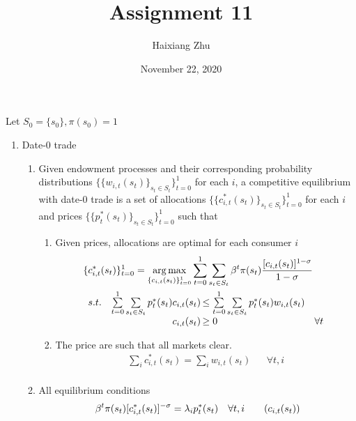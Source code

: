 \documentclass{article}
\title{Assignment 11}
\date{November 22, 2020}
\author{Haixiang Zhu}
\DeclareMathOperator*{\argmax}{arg\,max}
\begin{document}
    \maketitle
    \renewcommand{\arraystretch}{1.5}
    Let \(S_0=\{s_0\},\pi(s_0)=1\)
    \begin{enumerate}
        \item Date-0 trade
        \begin{enumerate}
            \item Given endowment processes and their corresponding probability distributions \(\{\{w_{i,t}(s_t)\}_{s_t\in S_t}\}_{t=0}^1\) for each \(i\), 
            a competitive equilibrium with date-0 trade is a set of allocations \(\{\{c_{i,t}^\ast(s_t)\}_{s_t\in S_t}\}_{t=0}^1\) 
            for each \(i\) and prices \(\{\{p_{t}^\ast(s_t)\}_{s_t\in S_t}\}_{t=0}^1\) such that
            \begin{enumerate}[label=\arabic*)]
                \item Given prices, allocations are optimal for each consumer \(i\)
                \begin{align*}
                    &\{c_{i,t}^\ast(s_t)\}_{t=0}^1=\argmax_{\{c_{i,t}(s_t)\}_{t=0}^1}\sum_{t=0}^1\sum_{s_t\in S_t}\beta^t\pi(s_t)\frac{[c_{i,t}(s_t)]^{1-\sigma}}{1-\sigma}\\
                    &\begin{array}{r@{\quad}r@{}l@{\quad}l}
                    s.t.&\sum\limits_{t=0}^1\sum\limits_{s_t\in S_t}p_t^\ast(s_t)c_{i,t}(s_t)&\,\le\sum\limits_{t=0}^1\sum\limits_{s_t\in S_t}p_t^\ast(s_t)w_{i,t}(s_t)\\
                    &c_{i,t}(s_t)&\,\ge0 &\forall t
                    \end{array} 
                \end{align*}
                \item The price are such that all markets clear.
                \begin{align*}
                    \sum_i c_{i,t}^\ast(s_t)=\sum_i w_{i,t}(s_t)&&\forall t,i\\
                \end{align*}
            \end{enumerate}
            \item All equilibrium conditions
            \begin{align}
                \beta^t\pi(s_t)[c_{i,t}^\ast(s_t)]^{-\sigma}&=\lambda_ip_t^\ast(s_t)&\forall t,i\tag{\(c_{i,t}(s_t)\)}\label{c}\\

\end{align}
\end{enumerate}
\end{enumerate}
\end{document}
